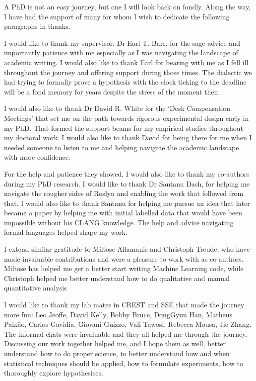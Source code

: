 \begin{acknowledgements}
    
A PhD is not an easy journey, but one I will look back on fondly. Along the way,
I have had the support of many for whom I wish to dedicate the following
paragraphs in thanks.

I would like to thank my supervisor, Dr Earl T. Barr, for the sage advice and
importantly patience with me especially as I was navigating the landscape of
academic writing. I would also like to thank Earl for bearing with me as I fell
ill throughout the journey and offering support during those times. The
dialectic we had trying to formally prove a hypothesis with the clock ticking to
the deadline will be a fond memory for years despite the stress of the moment
then.

I would also like to thank Dr David R. White for the `Desk Compensation
Meetings' that set me on the path towards rigorous experimental design early in
my PhD. That formed the support beams for my empirical studies throughout my
doctoral work. I would also like to thank David for being there for me when I
needed someone to listen to me and helping navigate the academic landscape with
more confidence.

For the help and patience they showed, I would also like to thank my co-authors
during my PhD research. I would like to thank Dr Santanu Dash, for helping me
navigate the rougher sides of Roslyn and enabling the work that followed from
that. I would also like to thank Santanu for helping me pursue an idea that
later became a paper by helping me with initial labelled data that would have
been impossible without his CLANG knowledge. The help and advice navigating
formal languages helped shape my work.

I extend similar gratitude to Miltose Allamanis and Christoph Treude, who have
made invaluable contributions and were a pleasure to work with as co-authors.
Miltose has helped me get a better start writing Machine Learning code, while
Christoph helped me better understand how to do qualitative and manual
quantitative analysis

I would like to thank my lab mates in CREST and SSE that made the journey more
fun: Leo Jeoffe, David Kelly, Bobby Bruce, DongGyun Han, Matheus Paix\~ao,
Carlos Gavidia, Giovani Guizzo, Vali Tawosi, Rebecca Mousa, Jie Zhang. The
informal chats were invaluable and they all helped me through the journey.
Discussing our work together helped me, and I hope them as well, better
understand how to do proper science, to better understand how and when
statistical techniques should be applied, how to formulate experiments, how to
thoroughly explore hypothesises.


\end{acknowledgements}
